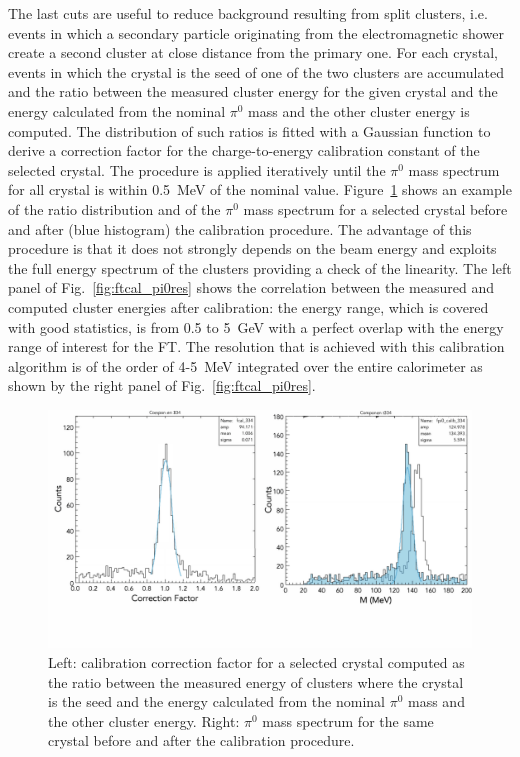 The last cuts are useful to reduce background resulting from split clusters, i.e. events in which a secondary particle originating from the electromagnetic shower create a second cluster at close distance from the primary one.  For each crystal, events in which the
crystal is the seed of one of the two clusters are accumulated and the ratio between the measured cluster energy
for the given crystal and the energy calculated from the nominal $\pi^0$ mass and the other cluster energy is
computed. The distribution of such ratios is fitted with a Gaussian function to derive a correction factor for the
charge-to-energy calibration constant of the selected crystal. The procedure is applied iteratively until the $\pi^0$
mass spectrum for all crystal is within 0.5~MeV of the nominal value. Figure~\ref{fig:ftcal_pi0} shows an example of
the ratio distribution and of the $\pi^0$ mass spectrum for a selected crystal before and after (blue histogram)
the calibration procedure. The advantage of this procedure is that it does not strongly depends on the beam energy
and exploits the full energy spectrum of the clusters providing a check of the linearity. The left panel of
Fig.~\ref{fig:ftcal_pi0res} shows the  correlation between the measured and computed cluster energies after
calibration: the energy range, which is covered with good statistics, is from 0.5 to 5~GeV with a perfect overlap with
the energy range of interest for the FT. The resolution that is achieved with this calibration algorithm is of the order
of 4-5~MeV integrated over the entire calorimeter as  shown by the right panel of Fig.~\ref{fig:ftcal_pi0res}.

\begin{figure}
\includegraphics[height=0.46\columnwidth]{fig/ftcal_pi0.pdf}
\caption{Left: calibration correction factor for a selected crystal computed as the ratio between the measured
  energy of clusters where the crystal is the seed and the energy calculated from the nominal $\pi^0$ mass and the
  other cluster energy. Right: $\pi^0$ mass spectrum for the same crystal before and after the calibration procedure.}
\label{fig:ftcal_pi0}
\end{figure}

